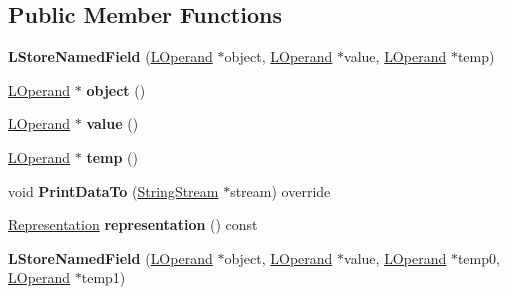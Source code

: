 \subsection*{Public Member Functions}
\begin{DoxyCompactItemize}
\item 
{\bfseries L\+Store\+Named\+Field} (\hyperlink{classv8_1_1internal_1_1_l_operand}{L\+Operand} $\ast$object, \hyperlink{classv8_1_1internal_1_1_l_operand}{L\+Operand} $\ast$value, \hyperlink{classv8_1_1internal_1_1_l_operand}{L\+Operand} $\ast$temp)\hypertarget{classv8_1_1internal_1_1_l_store_named_field_a6d2a4f20bdb4927c9401f7f7dd706d15}{}\label{classv8_1_1internal_1_1_l_store_named_field_a6d2a4f20bdb4927c9401f7f7dd706d15}

\item 
\hyperlink{classv8_1_1internal_1_1_l_operand}{L\+Operand} $\ast$ {\bfseries object} ()\hypertarget{classv8_1_1internal_1_1_l_store_named_field_a322fe15f20a68dfd3429f31bb46ce109}{}\label{classv8_1_1internal_1_1_l_store_named_field_a322fe15f20a68dfd3429f31bb46ce109}

\item 
\hyperlink{classv8_1_1internal_1_1_l_operand}{L\+Operand} $\ast$ {\bfseries value} ()\hypertarget{classv8_1_1internal_1_1_l_store_named_field_a7c1b623b85070a53e7c8ca36113808c7}{}\label{classv8_1_1internal_1_1_l_store_named_field_a7c1b623b85070a53e7c8ca36113808c7}

\item 
\hyperlink{classv8_1_1internal_1_1_l_operand}{L\+Operand} $\ast$ {\bfseries temp} ()\hypertarget{classv8_1_1internal_1_1_l_store_named_field_ad77491ce510eaa0f150539ec8815c14f}{}\label{classv8_1_1internal_1_1_l_store_named_field_ad77491ce510eaa0f150539ec8815c14f}

\item 
void {\bfseries Print\+Data\+To} (\hyperlink{classv8_1_1internal_1_1_string_stream}{String\+Stream} $\ast$stream) override\hypertarget{classv8_1_1internal_1_1_l_store_named_field_a737f49c6847cd030f17c69b314c54b6c}{}\label{classv8_1_1internal_1_1_l_store_named_field_a737f49c6847cd030f17c69b314c54b6c}

\item 
\hyperlink{classv8_1_1internal_1_1_representation}{Representation} {\bfseries representation} () const \hypertarget{classv8_1_1internal_1_1_l_store_named_field_acf09ef122d9ca6738894c92b8f3e24ef}{}\label{classv8_1_1internal_1_1_l_store_named_field_acf09ef122d9ca6738894c92b8f3e24ef}

\item 
{\bfseries L\+Store\+Named\+Field} (\hyperlink{classv8_1_1internal_1_1_l_operand}{L\+Operand} $\ast$object, \hyperlink{classv8_1_1internal_1_1_l_operand}{L\+Operand} $\ast$value, \hyperlink{classv8_1_1internal_1_1_l_operand}{L\+Operand} $\ast$temp0, \hyperlink{classv8_1_1internal_1_1_l_operand}{L\+Operand} $\ast$temp1)\hypertarget{classv8_1_1internal_1_1_l_store_named_field_a747f0948d3ad04ce8b4d10ce5bdce276}{}\label{classv8_1_1internal_1_1_l_store_named_field_a747f0948d3ad04ce8b4d10ce5bdce276}


\end{DoxyCompactItemize}
